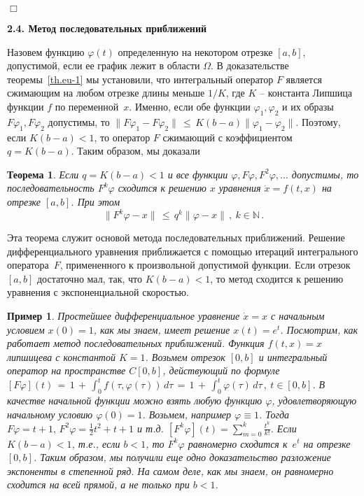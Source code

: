 \documentclass[12pt,a4paper]{article}
\newtheorem{theorem}{Теорема}
\newtheorem{ex}{Пример}
\newcommand{\n}{{\mathbb N}}
\begin{document}
   {\hfill $\Box$}
\medskip


\medskip
\begin{center}
\textbf{2.4. Метод последовательных приближений}
\end{center}
\medskip

Назовем функцию $\varphi(t)$ определенную  на некотором отрезке $[a,b]$, допустимой, если
ее график лежит в области $\Omega$.
В доказательстве теоремы~\ref{th.eu-1} мы установили, что интегральный оператор $F$ является сжимающим на любом отрезке
длины меньше $1/K$, где $K$ -- константа Липшица функции $f$ по переменной~$x$. Именно, если обе функции $\varphi_1, \varphi_2$ и их образы $F\varphi_1, F\varphi_2$
допустимы, то  $\|F\varphi_1 - F\varphi_2 \|\, \le \, K(b-a)\|\varphi_1 - \varphi_2\|$.
Поэтому, если $K(b-a) < 1$, то оператор $F$ сжимающий с коэффициентом $q = K(b-a)$. Таким образом, мы доказали
\begin{theorem}\label{th.secv}
Если $q = K(b-a) < 1$   и  все функции $\varphi, F\varphi, F^2\varphi, \ldots$ допустимы, то последовательность
$F^k \varphi$ сходится к решению $x$ уравнения $\dot x = f(t, x) $ на отрезке $[a, b]$. При этом
$$
\|F^k \varphi - x\|\, \le \, q^k \|\varphi - x\|\, , \ k \in \n\, .
$$
\end{theorem}
Эта теорема служит основой метода последовательных приближений. Решение дифференциального уравнения
приближается с помощью итераций интегрального оператора~$F$, примененного к произвольной допустимой функции.
 Если отрезок $[a, b]$ достаточно мал, так, что $K(b-a) < 1$, то
метод сходится к решению уравнения с экспоненциальной  скоростью.
\begin{ex}\label{ex.secv}
{\em Простейшее дифференциальное уравнение $\dot x = x$ с начальным условием $x(0)=1$, как мы знаем, имеет решение
$x(t) = e^t$. Посмотрим, как работает метод последовательных приближений. Функция $f(t, x) = x$ липшицева с константой
 $K=1$. Возьмем отрезок $[0, b]$ и интегральный
оператор на пространстве $C[0, b]$,  действующий по формуле
$[F\varphi] (t) \, = \, 1\, +\, \int_0^t f(\tau, \varphi(\tau))\, d \tau \, = \, 1\, + \,
\int_0^t \varphi(\tau)\, d \tau\, , \
t \in [0, b]$.
В качестве начальной функции можно взять любую функцию $\varphi$, удовлетворяющую начальному условию $\varphi(0)=1$.
Возьмем, например $\varphi \equiv 1$. Тогда $F\varphi = t+1, \, F^2\varphi = \frac{1}{2}t^2 + t+ 1$ и т.д.
$[F^k\varphi ](t) = \sum_{m=0}^k \frac{t^k}{k!}$. Если $K(b-a) < 1$, т.е., если $b < 1$, то $F^k \varphi$ равномерно сходится
к~$e^t$ на отрезке $[0, b]$. Таким образом, мы получили еще одно доказательство разложение экспоненты в степенной ряд.
На самом деле, как мы знаем, он равномерно сходится на всей прямой, а не только при $b<1$.
}
\end{ex}
\end{document}
